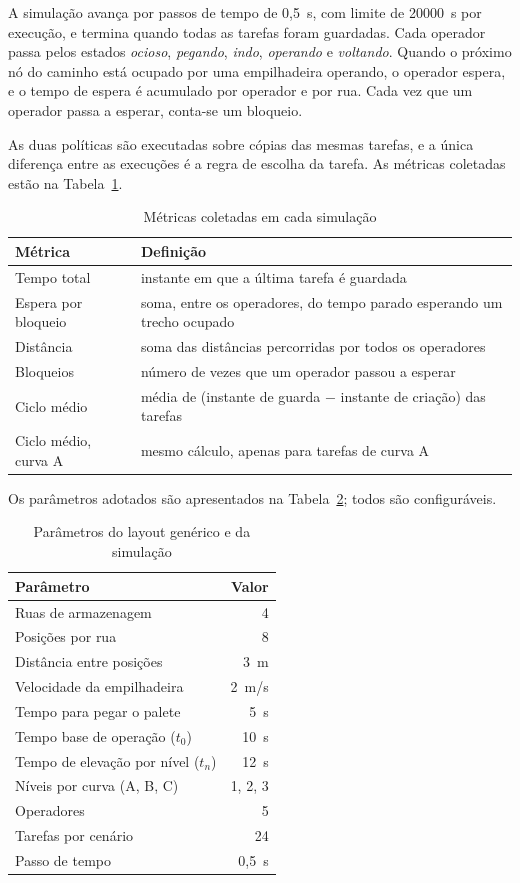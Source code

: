 \documentclass[
	article,
	11pt,
	oneside,
	a4paper,
	english,
	brazil,
	sumario=tradicional
	]{abntex2}
\begin{document}
A simulação avança por passos de tempo de 0,5~s, com limite de 20000~s por
execução, e termina quando todas as tarefas foram guardadas. Cada operador
passa pelos estados \emph{ocioso}, \emph{pegando}, \emph{indo},
\emph{operando} e \emph{voltando}. Quando o próximo nó do caminho está ocupado
por uma empilhadeira operando, o operador espera, e o tempo de espera é
acumulado por operador e por rua. Cada vez que um operador passa a esperar,
conta-se um bloqueio.

As duas políticas são executadas sobre cópias das mesmas tarefas, e a única
diferença entre as execuções é a regra de escolha da tarefa. As métricas
coletadas estão na Tabela~\ref{tab:metricas}.

\begin{table}[htb]
	\centering
	\caption{Métricas coletadas em cada simulação}
	\label{tab:metricas}
	\begin{tabular}{lp{8cm}}
		\toprule
		Métrica & Definição \\
		\midrule
		Tempo total & instante em que a última tarefa é guardada \\
		Espera por bloqueio & soma, entre os operadores, do tempo parado esperando um trecho ocupado \\
		Distância & soma das distâncias percorridas por todos os operadores \\
		Bloqueios & número de vezes que um operador passou a esperar \\
		Ciclo médio & média de (instante de guarda $-$ instante de criação) das tarefas \\
		Ciclo médio, curva A & mesmo cálculo, apenas para tarefas de curva A \\
		\bottomrule
	\end{tabular}
\end{table}

Os parâmetros adotados são apresentados na Tabela~\ref{tab:parametros}; todos
são configuráveis.

\begin{table}[htb]
	\centering
	\caption{Parâmetros do layout genérico e da simulação}
	\label{tab:parametros}
	\begin{tabular}{lr}
		\toprule
		Parâmetro & Valor \\
		\midrule
		Ruas de armazenagem & 4 \\
		Posições por rua & 8 \\
		Distância entre posições & 3~m \\
		Velocidade da empilhadeira & 2~m/s \\
		Tempo para pegar o palete & 5~s \\
		Tempo base de operação ($t_0$) & 10~s \\
		Tempo de elevação por nível ($t_n$) & 12~s \\
		Níveis por curva (A, B, C) & 1, 2, 3 \\
		Operadores & 5 \\
		Tarefas por cenário & 24 \\
		Passo de tempo & 0,5~s \\
		\bottomrule
	\end{tabular}
\end{table}
\end{document}
